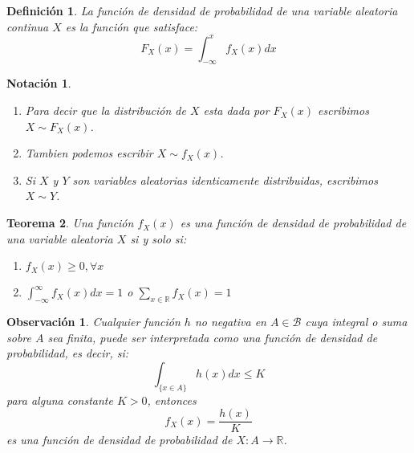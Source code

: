 \documentclass[14pt]{extarticle}
\newtheorem{theorem}{Teorema}[section]
\newtheorem{definition}[theorem]{Definición}
\newtheorem{remark}{Observación}[section]
\newtheorem{note}{Notación}[section]
\begin{document}
\begin{definition}
    La función de densidad de probabilidad de una variable aleatoria continua $X$ es la función que satisface:
    \[
        F_X(x) = \int_{-\infty}^x f_X(x) dx
    \]
\end{definition}

\begin{note}
    \begin{enumerate}
        \item Para decir que la distribución de $X$ esta dada por $F_X(x)$ escribimos $X \sim F_X(x)$.
        \item Tambien podemos escribir $X \sim f_X(x)$.
        \item Si $X$ y $Y$ son variables aleatorias identicamente distribuidas, escribimos $X \sim Y$.
    \end{enumerate}
\end{note}

\begin{theorem}
    Una función $f_X(x)$ es una función de densidad de probabilidad de una variable aleatoria $X$ si y solo si:
    \begin{enumerate}
        \item $f_X(x) \geq 0, \forall x$
        \item $\int_{-\infty}^\infty f_X(x) dx = 1$ o $\sum_{x \in \mathbb{R}} f_X(x) = 1$
    \end{enumerate}
\end{theorem}

\begin{remark}
    Cualquier función $h$ no negativa en $A \in \mathcal{B}$ cuya integral o suma sobre $A$ sea finita,
     puede ser interpretada como una función de densidad de probabilidad, es decir, si:
     \[
        \int_{\{x \in A\}} h(x) dx \leq K 
     \]
      para alguna constante $K>0$, entonces $$f_X(x) = \frac{h(x)}{K}$$ es una función de densidad de probabilidad de 
      $X:A \to \mathbb{R}$.
\end{remark}






\end{document}
